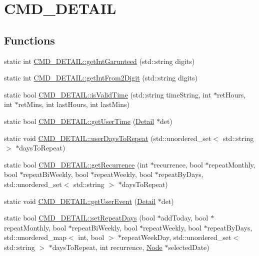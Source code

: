 \hypertarget{group__CMD__DETAIL}{\section{C\-M\-D\-\_\-\-D\-E\-T\-A\-I\-L}
\label{group__CMD__DETAIL}
}
\subsection*{Functions}
\begin{DoxyCompactItemize}
\item 
static int \hyperlink{group__CMD__DETAIL_gae5f62f8c2c8ec4735c4bfba3e8ff1dbe}{C\-M\-D\-\_\-\-D\-E\-T\-A\-I\-L\-::get\-Int\-Garunteed} (std\-::string digits)
\item 
static int \hyperlink{group__CMD__DETAIL_gab55ffe2dd662c04c46f186949f67687f}{C\-M\-D\-\_\-\-D\-E\-T\-A\-I\-L\-::get\-Int\-From2\-Digit} (std\-::string digits)
\item 
static bool \hyperlink{group__CMD__DETAIL_ga29ba75ec42415d88530bf7d3f03001ef}{C\-M\-D\-\_\-\-D\-E\-T\-A\-I\-L\-::is\-Valid\-Time} (std\-::string time\-String, int $\ast$ret\-Hours, int $\ast$ret\-Mins, int last\-Hours, int last\-Mins)
\item 
static bool \hyperlink{group__CMD__DETAIL_ga52e8172ce6105959e8df1e6b66942092}{C\-M\-D\-\_\-\-D\-E\-T\-A\-I\-L\-::get\-User\-Time} (\hyperlink{classDetail}{Detail} $\ast$det)
\item 
static void \hyperlink{group__CMD__DETAIL_ga179b6930ace840a1b90415d9445360d3}{C\-M\-D\-\_\-\-D\-E\-T\-A\-I\-L\-::user\-Days\-To\-Repeat} (std\-::unordered\-\_\-set$<$ std\-::string $>$ $\ast$days\-To\-Repeat)
\item 
static bool \hyperlink{group__CMD__DETAIL_ga252bd82356adeffbbe613c41329608cb}{C\-M\-D\-\_\-\-D\-E\-T\-A\-I\-L\-::get\-Recurrence} (int $\ast$recurrence, bool $\ast$repeat\-Monthly, bool $\ast$repeat\-Bi\-Weekly, bool $\ast$repeat\-Weekly, bool $\ast$repeat\-By\-Days, std\-::unordered\-\_\-set$<$ std\-::string $>$ $\ast$days\-To\-Repeat)
\item 
static void \hyperlink{group__CMD__DETAIL_gaa62607ee248ceddc948be24d50691a04}{C\-M\-D\-\_\-\-D\-E\-T\-A\-I\-L\-::get\-User\-Event} (\hyperlink{classDetail}{Detail} $\ast$det)
\item 
static bool \hyperlink{group__CMD__DETAIL_ga95245c4a89879b482ae7ae360b1be3ac}{C\-M\-D\-\_\-\-D\-E\-T\-A\-I\-L\-::set\-Repeat\-Days} (bool $\ast$add\-Today, bool $\ast$repeat\-Monthly, bool $\ast$repeat\-Bi\-Weekly, bool $\ast$repeat\-Weekly, bool $\ast$repeat\-By\-Days, std\-::unordered\-\_\-map$<$ int, bool $>$ $\ast$repeat\-Week\-Day, std\-::unordered\-\_\-set$<$ std\-::string $>$ $\ast$days\-To\-Repeat, int recurrence, \hyperlink{classNode}{Node} $\ast$selected\-Date)

\end{DoxyCompactItemize}
